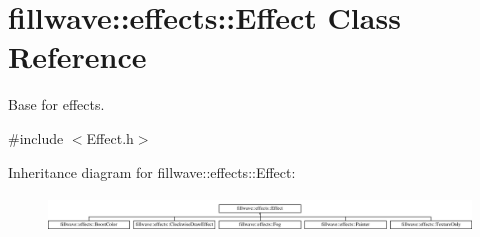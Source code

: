 \hypertarget{classfillwave_1_1effects_1_1Effect}{}\section{fillwave\+:\+:effects\+:\+:Effect Class Reference}
\label{classfillwave_1_1effects_1_1Effect}


Base for effects.  




{\ttfamily \#include $<$Effect.\+h$>$}

Inheritance diagram for fillwave\+:\+:effects\+:\+:Effect\+:\begin{figure}[H]
\begin{center}
\leavevmode
\includegraphics[height=0.961373cm]{classfillwave_1_1effects_1_1Effect}
\end{center}
\end{figure}
